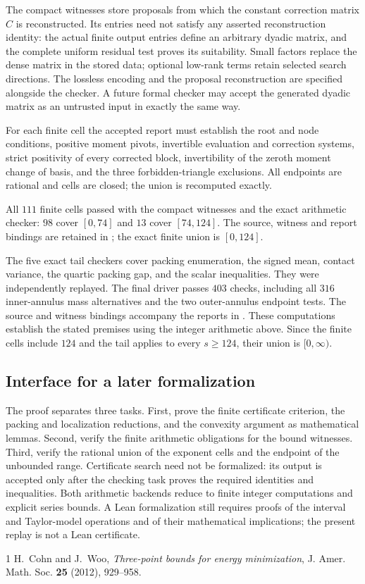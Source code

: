 \documentclass[12pt,reqno]{amsart}
\theoremstyle{definition}
\numberwithin{equation}{section}
\begin{document}
The compact witnesses store proposals from which the constant
correction matrix $C$ is reconstructed. Its entries need not satisfy
any asserted reconstruction identity: the actual finite output entries
define an arbitrary dyadic matrix, and the complete uniform residual
test proves its suitability. Small factors replace the dense matrix
in the stored data; optional low-rank terms retain selected search
directions. The lossless encoding and the proposal reconstruction are
specified alongside the checker. A future formal checker may accept
the generated dyadic matrix as an untrusted input in exactly the same way.

For each finite cell the accepted report must establish the root and
node conditions, positive moment pivots, invertible evaluation and
correction systems, strict positivity of every corrected block,
invertibility of the zeroth moment change of basis, and the three
forbidden-triangle exclusions. All endpoints are rational and cells
are closed; the union is recomputed exactly.

All $111$ finite cells passed with the compact witnesses and the exact
arithmetic checker: $98$ cover $[0,74]$ and $13$ cover $[74,124]$.
The source, witness and report bindings are retained in
; the exact finite union is $[0,124]$.

The five exact tail checkers cover packing enumeration, the signed mean,
contact variance, the quartic packing gap, and the scalar inequalities.
They were independently replayed. The final driver
passes $403$ checks, including all $316$ inner-annulus mass
alternatives and the two outer-annulus endpoint tests. The source and
witness bindings accompany the reports in .
These computations establish the stated premises using the integer
arithmetic above. Since the finite cells include $124$ and the tail applies
to every $s\ge124$, their union is $[0,\infty)$.

\subsection{Interface for a later formalization}
The proof separates three tasks. First, prove the finite certificate
criterion, the packing and localization reductions, and the convexity
argument as mathematical lemmas. Second, verify the finite arithmetic
obligations for the bound witnesses. Third, verify the rational union
of the exponent cells and the endpoint of the unbounded range.
Certificate search need not be formalized: its output is accepted only
after the checking task proves the required identities and inequalities.
Both arithmetic backends reduce to finite integer computations and
explicit series bounds. A Lean formalization still requires proofs of
the interval and Taylor-model operations and of their mathematical
implications; the present replay is not a Lean certificate.

\begin{thebibliography}{1}
H.~Cohn and J.~Woo,
\emph{Three-point bounds for energy minimization},
J. Amer. Math. Soc. \textbf{25} (2012), 929--958.
\end{thebibliography}
\end{document}
